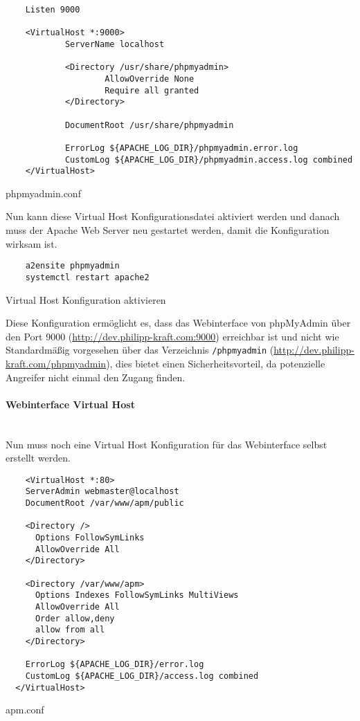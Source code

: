 \begin{listing}[H]
  \begin{verbatim}
    Listen 9000

    <VirtualHost *:9000>
            ServerName localhost
    
            <Directory /usr/share/phpmyadmin>
                    AllowOverride None
                    Require all granted
            </Directory>
    
            DocumentRoot /usr/share/phpmyadmin
    
            ErrorLog ${APACHE_LOG_DIR}/phpmyadmin.error.log
            CustomLog ${APACHE_LOG_DIR}/phpmyadmin.access.log combined
    </VirtualHost>
  \end{verbatim}
  \caption{phpmyadmin.conf}
\end{listing}

Nun kann diese Virtual Host Konfigurationsdatei aktiviert werden und danach
muss der Apache Web Server neu gestartet werden, damit die Konfiguration wirksam
ist.

\begin{listing}[H]
  \begin{verbatim}
    a2ensite phpmyadmin
    systemctl restart apache2
  \end{verbatim}
  \caption{Virtual Host Konfiguration aktivieren}
\end{listing}

Diese Konfiguration ermöglicht es, dass das Webinterface von phpMyAdmin über den
Port 9000 (\url{http://dev.philipp-kraft.com:9000}) erreichbar ist und nicht wie
Standardmäßig vorgesehen über das Verzeichnis \verb|/phpmyadmin|
(\url{http://dev.philipp-kraft.com/phpmyadmin}), dies bietet einen
Sicherheitsvorteil, da potenzielle Angreifer nicht einmal den Zugang finden.

\paragraph{Webinterface Virtual Host}\mbox{}\\

Nun muss noch eine Virtual Host Konfiguration für das Webinterface selbst
erstellt werden.

\begin{listing}[H]
  \begin{verbatim}
    <VirtualHost *:80>
    ServerAdmin webmaster@localhost
    DocumentRoot /var/www/apm/public
          
    <Directory />
      Options FollowSymLinks
      AllowOverride All
    </Directory>
  
    <Directory /var/www/apm>
      Options Indexes FollowSymLinks MultiViews
      AllowOverride All
      Order allow,deny
      allow from all
    </Directory>
  
    ErrorLog ${APACHE_LOG_DIR}/error.log
    CustomLog ${APACHE_LOG_DIR}/access.log combined
  </VirtualHost>
  \end{verbatim}
  \caption{apm.conf}
\end{listing}

